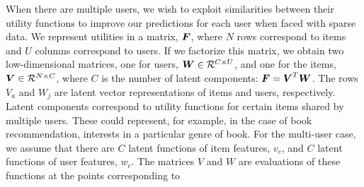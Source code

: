 
When there are multiple users, we wish to exploit similarities between their utility functions 
to improve our predictions for each user when faced with sparse data.
We represent utilities in a matrix, $\boldsymbol{F}$,
where $N$ rows correspond to items and $U$ columns correspond to users. %
If we factorize this matrix, we obtain two low-dimensional matrices,
one for users, $\boldsymbol{W} \in \mathcal{R}^{C \times U}$, 
and one for the items, $\boldsymbol{V} \in \mathcal{R}^{N \times C}$,
where $C$ is the number of latent components:
$\boldsymbol{F} = \boldsymbol{V}^T \boldsymbol{W}$.
The rows $V_a$ and $W_j$ are latent vector representations of items and users, respectively.
Latent components correspond to utility functions for certain items shared by multiple users.
These could represent, for example, 
in the case of book recommendation, interests in a particular genre of book. 
For the multi-user case, we assume that there are $C$ latent functions of item features, $v_c$, 
 and $C$ latent functions of user features, $w_c$.
The matrices $V$ and $W$ are evaluations of these functions at the points corresponding to 
